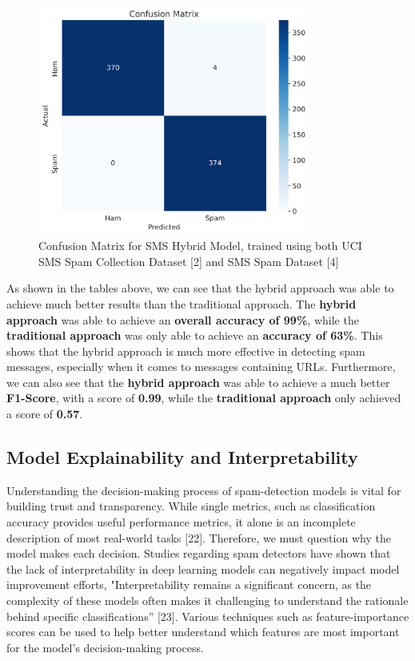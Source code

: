 \documentclass{article}
\begin{document}
\begin{figure}[htbp]
    \centering
    \includegraphics[width=0.8\textwidth]{../analysis/sms/hybrid/confusion_matrix.png}
    \caption{Confusion Matrix for SMS Hybrid Model, trained using both UCI SMS Spam Collection Dataset [2] and SMS Spam Dataset [4]}
    \label{fig:confusion_matrix_7}
\end{figure}

\newpage

\noindent
As shown in the tables above, we can see that the hybrid approach was able to achieve much better results than the traditional approach. The \textbf{hybrid approach} was able to achieve an \textbf{overall accuracy of 99\%}, while the \textbf{traditional approach} was only able to achieve an \textbf{accuracy of 63\%}. This shows that the hybrid approach is much more effective in detecting spam messages, especially when it comes to messages containing URLs. Furthermore, we can also see that the \textbf{hybrid approach} was able to achieve a much better \textbf{F1-Score}, with a score of \textbf{0.99}, while the \textbf{traditional approach} only achieved a score of \textbf{0.57}.

\subsection{Model Explainability and Interpretability}

\noindent
Understanding the decision-making process of spam-detection models is vital for building trust and transparency. While single metrics, such as classification accuracy provides useful performance metrics, it alone is an incomplete description of most real-world tasks [22]. Therefore, we must question why the model makes each decision. Studies regarding spam detectors have shown that the lack of interpretability in deep learning models can negatively impact model improvement efforts, "Interpretability remains a significant concern, as the complexity of these models often makes it challenging to understand the rationale behind specific classifications” [23]. Various techniques such as feature-importance scores can be used to help better understand which features are most important for the model's decision-making process. 
\end{document}
